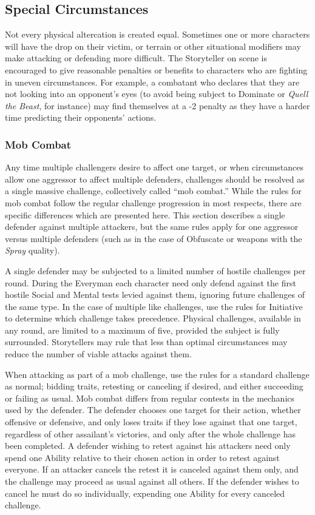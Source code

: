 \subsection{Special Circumstances}
Not every physical altercation is created equal.  Sometimes one or more characters will have the 
drop on their victim, or terrain or other situational modifiers may make attacking or defending 
more difficult.  The Storyteller on scene is encouraged to give reasonable penalties or benefits 
to characters who are fighting in uneven circumstances.  For example, a combatant who declares that 
they are not looking into an opponent's eyes (to avoid being subject to Dominate or \emph{Quell the 
Beast}, for instance) may find themselves at a -2 penalty as they have a harder time predicting their 
opponents' actions.

\subsubsection{Mob Combat}
\label{subsec:mobcombat}
Any time multiple challengers desire to affect one target, or when circumstances allow one aggressor 
to affect multiple defenders, challenges should be resolved as a single massive challenge, collectively 
called ``mob combat.''  While the rules for mob combat follow the regular challenge progression in most 
respects, there are specific differences which are presented here.  This section describes a single 
defender against multiple attackers, but the same rules apply for one aggressor versus multiple defenders 
(such as in the case of Obfuscate or weapons with the \emph{Spray} quality).

A single defender may be subjected to a limited number of hostile challenges per round.  During 
the Everyman each character need only defend against the first hostile Social and Mental tests 
levied against them, ignoring future challenges of the same type.  In the case of multiple like 
challenges, use the rules for Initiative to determine which challenge takes precedence.  Physical 
challenges, available in any round, are limited to a maximum of five, provided the subject is fully 
surrounded.  Storytellers may rule that less than optimal circumstances may reduce the number of 
viable attacks against them.

When attacking as part of a mob challenge, use the rules for a standard challenge as normal; 
bidding traits, retesting or canceling if desired, and either succeeding or failing as usual.  
Mob combat differs from regular contests in the mechanics used by the defender.  The defender 
chooses one target for their action, whether offensive or defensive, and only loses traits if 
they lose against that one target, regardless of other assailant's victories, and only after the 
whole challenge has been completed.  A defender wishing to retest against his attackers need only 
spend one Ability relative to their chosen action in order to retest against everyone.  If an 
attacker cancels the retest it is canceled against them only, and the challenge may proceed as 
usual against all others.  If the defender wishes to cancel he must do so individually, expending 
one Ability for every canceled challenge.


